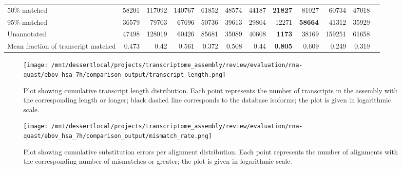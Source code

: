 \documentclass[12pt,a4paper]{article}
\begin{document}
\begin{table}[t]
\begin{adjustbox}{width=1\textwidth}
\begin{tabular}{|l*{11}{|r}|}
50\%-matched                                            & 58201                  & 117092                 & 140767                 & 61852                  & 48574                  & 44187                  & \textbf{21827}         & 81027                  & 60734                  & 47018                  \\
95\%-matched                                            & 36579                  & 79703                  & 67696                  & 50736                  & 39613                  & 29804                  & 12271                  & \textbf{58664}         & 41312                  & 35929                  \\
Unannotated                                             & 47498                  & 128019                 & 60426                  & 85681                  & 35089                  & 40608                  & \textbf{1173}          & 38169                  & 159251                 & 61658                  \\
Mean fraction of transcript matched                     & 0.473                  & 0.42                   & 0.561                  & 0.372                  & 0.508                  & 0.44                   & \textbf{0.805}         & 0.609                  & 0.249                  & 0.319                  \\ \hline
\end{tabular}
\end{adjustbox}
\end{table}

\FloatBarrier
\clearpage
{}

\begin{figure}[t]
\centering
\texttt{[image: /mnt/dessertlocal/projects/transcriptome\_assembly/review/evaluation/rna-quast/ebov\_hsa\_7h/comparison\_output/transcript\_length.png]}
\caption{Plot showing cumulative transcript length distribution. Each point represents the number of transcripts in the assembly with the corresponding length or longer; black dashed line corresponds to the database isoforms; the plot is given in logarithmic scale.}
\end{figure}
\FloatBarrier
\clearpage


\begin{figure}[t]
\centering
\texttt{[image: /mnt/dessertlocal/projects/transcriptome\_assembly/review/evaluation/rna-quast/ebov\_hsa\_7h/comparison\_output/mismatch\_rate.png]}
\caption{Plot showing cumulative substitution errors per alignment distribution. Each point represents the number of alignments with the corresponding number of mismatches or greater; the plot is given in logarithmic scale.}
\end{figure}
\FloatBarrier
\clearpage
\end{document}
